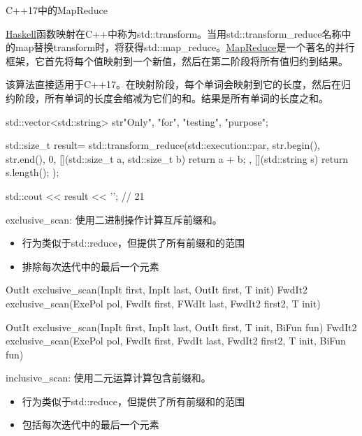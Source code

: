\begin{myTip}{C++17中的MapReduce}

\href{https://www.haskell.org/}{Haskell}函数映射在C++中称为std::transform。当用std::transform\_reduce名称中的map替换transform时，将获得std::map\_reduce。\href{https://en.wikipedia.org/wiki/MapReduce}{MapReduce}是一个著名的并行框架，它首先将每个值映射到一个新值，然后在第二阶段将所有值归约到结果。

该算法直接适用于C++17。在映射阶段，每个单词会映射到它的长度，然后在归约阶段，所有单词的长度会缩减为它们的和。结果是所有单词的长度之和。

\begin{cpp}
std::vector<std::string> str{"Only", "for", "testing", "purpose"};

std::size_t result= std::transform_reduce(std::execution::par,
				str.begin(), str.end(), 0,
				[](std::size_t a, std::size_t b){ return a + b; },
				[](std::string s){ return s.length(); });

std::cout << result << '\n'; // 21
\end{cpp}

\end{myTip}

exclusive\_scan: 使用二进制操作计算互斥前缀和。

\begin{itemize}
\item
行为类似于std::reduce，但提供了所有前缀和的范围

\item
排除每次迭代中的最后一个元素
\end{itemize}

\begin{cpp}
OutIt exclusive_scan(InpIt first, InpIt last, OutIt first, T init)
FwdIt2 exclusive_scan(ExePol pol, FwdIt first, FWdIt last,
					  FwdIt2 first2, T init)

OutIt exclusive_scan(InpIt first, InpIt last, OutIt first, T init, BiFun fun)
FwdIt2 exclusive_scan(ExePol pol, FwdIt first, FwdIt last,
					  FwdIt2 first2, T init, BiFun fun)
\end{cpp}

inclusive\_scan: 使用二元运算计算包含前缀和。

\begin{itemize}
\item
行为类似于std::reduce，但提供了所有前缀和的范围

\item
包括每次迭代中的最后一个元素
\end{itemize}

